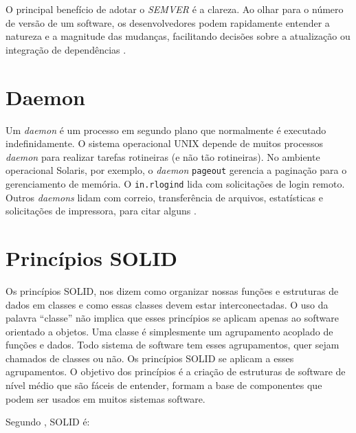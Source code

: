 \documentclass[12pt, %
openright, 
oneside, %
a4paper,    %
brazil]{facom-ufu-abntex2}
\begin{document}
O principal benefício de adotar o \textit{SEMVER} é a clareza. Ao olhar para o
número de versão de um software, os desenvolvedores podem rapidamente entender
a natureza e a magnitude das mudanças, facilitando decisões sobre a atualização
ou integração de dependências \cite{semver}.

\section{Daemon}

Um \textit{daemon} é um processo em segundo plano que normalmente é executado
indefinidamente. O sistema operacional UNIX depende de muitos processos
\textit{daemon} para realizar tarefas rotineiras (e não tão rotineiras). No
ambiente operacional Solaris, por exemplo, o \textit{daemon} \texttt{pageout}
gerencia a paginação para o gerenciamento de memória. O \texttt{in.rlogind}
lida com solicitações de login remoto. Outros \textit{daemons} lidam com
correio, transferência de arquivos, estatísticas e solicitações de impressora,
para citar alguns \cite{kay2004unix}.

\section{Princípios SOLID}

Os princípios SOLID, nos dizem como organizar nossas funções e estruturas de
dados em classes e como essas classes devem estar interconectadas. O uso da
palavra ``classe'' não implica que esses princípios se aplicam apenas ao
software orientado a objetos. Uma classe é simplesmente um agrupamento acoplado
de funções e dados. Todo sistema de software tem esses agrupamentos, quer sejam
chamados de classes ou não. Os princípios SOLID se aplicam a esses
agrupamentos. O objetivo dos princípios é a criação de estruturas de software
de nível médio que são fáceis de entender, formam a base de componentes que
podem ser usados em muitos sistemas software.

Segundo , SOLID é:
\end{document}
